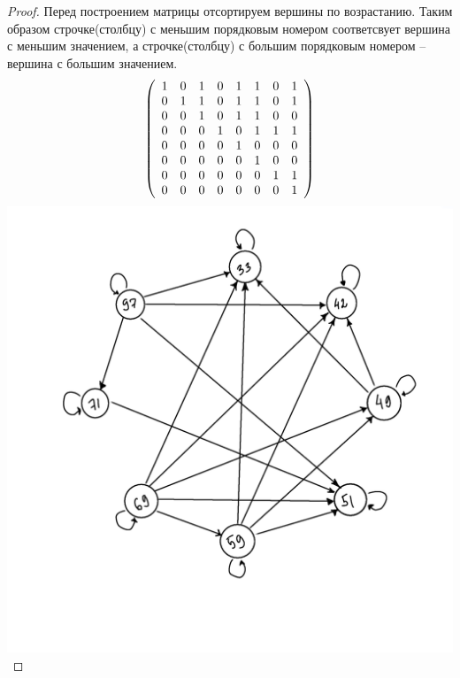 \begin{proof}
Перед построением матрицы отсортируем вершины по возрастанию. Таким образом строчке(столбцу) с меньшим порядковым номером соответсвует вершина с меньшим значением, а строчке(столбцу) с большим порядковым номером -- вершина с большим значением.
$$ \left( \begin{array}{c c c c c c c c } 
 1 & 0 & 1 & 0 & 1 & 1 & 0 & 1 \\ 

 0 & 1 & 1 & 0 & 1 & 1 & 0 & 1 \\

 0 & 0 & 1 & 0 & 1 & 1 & 0 & 0 \\
 
 0 & 0 & 0 & 1 & 0 & 1 & 1 & 1 \\
 
 0 & 0 & 0 & 0 & 1 & 0 & 0 & 0 \\
 
 0 & 0 & 0 & 0 & 0 & 1 & 0 & 0 \\
 
 0 & 0 & 0 & 0 & 0 & 0 & 1 & 1 \\
 
 0 & 0 & 0 & 0 & 0 & 0 & 0 & 1 \end {array} \right) $$
 \includegraphics{граф2.png}
\end{proof}

